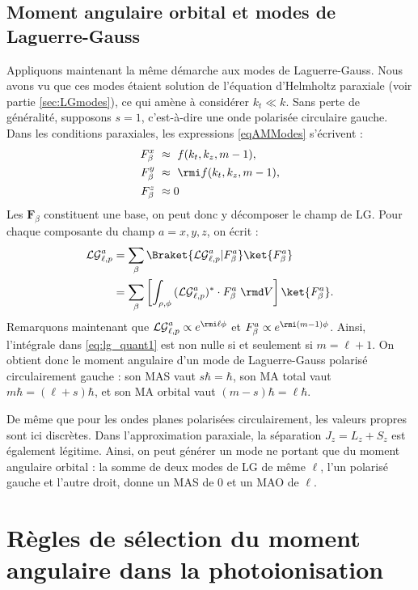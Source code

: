 \section{Moment angulaire orbital et modes de Laguerre-Gauss}
\label{sec:oamLG}
Appliquons maintenant la même démarche aux modes de Laguerre-Gauss. Nous avons vu que ces modes étaient solution de l'équation d'Helmholtz paraxiale (voir partie \ref{sec:LGmodes}), ce qui amène à considérer $k_t \ll k$. Sans perte de généralité, supposons $s=1$, c'est-à-dire une onde polarisée circulaire gauche. Dans les conditions paraxiales, les expressions \ref{eqAMModes} s'écrivent :
\begin{equation*}
\begin{aligned}
F_{\beta}^x ~&\approx ~ f(k_t,k_z,m-1),\\
F_{\beta}^y ~&\approx ~\rmi f(k_t,k_z,m-1),\\
F_{\beta}^z ~&\approx 0
\end{aligned}
\end{equation*}
Les $\bm{F}_{\beta}$ constituent une base, on peut donc y décomposer le champ de LG. Pour chaque composante du champ $a=x,y,z$, on écrit :
\begin{align}
\mathcal{LG}_{\ell,p}^a &= \sum_{\beta} \Braket{\mathcal{LG}_{\ell,p}^a|F_{\beta}^a}\ket{F_{\beta}^a} \nonumber\\
&= \sum_{\beta} \left[\int_{\rho,\phi}{(\mathcal{LG}_{\ell,p}^a)^*\cdot F_{\beta}^a\;\rmd V}\right]\ket{F_{\beta}^a}.
\label{eq:lg_quant1}
\end{align}
Remarquons maintenant que $\mathcal{LG}_{\ell,p}^a \propto e^{\rmi \ell \phi}$ et $F_{\beta}^a \propto e^{\rmi (m-1) \phi}$. Ainsi, l'intégrale dans \ref{eq:lg_quant1} est non nulle si et seulement si $m = \ell+1$. On obtient donc le moment angulaire d'un mode de Laguerre-Gauss polarisé circulairement gauche : son MAS vaut $s\hbar=\hbar$, son MA total vaut $m\hbar=(\ell+s)\hbar$, et son MA orbital vaut $(m-s)\hbar = \ell\hbar$. 

De même que pour les ondes planes polarisées circulairement, les valeurs propres sont ici discrètes. Dans l'approximation paraxiale, la séparation $J_z=L_z+S_z$ est également légitime. Ainsi, on peut générer un mode ne portant que du moment angulaire orbital : la somme de deux modes de LG de même $\ell$, l'un polarisé gauche et l'autre droit, donne un MAS de 0 et un MAO de $\ell$.  


\chapter{Règles de sélection du moment angulaire dans la photoionisation}
\label{sec:selectionrules}

